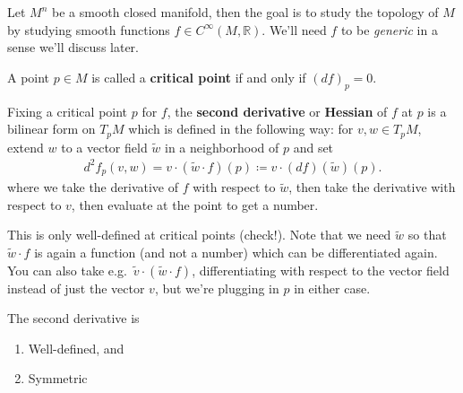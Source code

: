 Let \(M^n\) be a smooth closed manifold, then the goal is to study the
topology of \(M\) by studying smooth functions
\(f \in C^ \infty (M, {\mathbb{R}})\). We'll need \(f\) to be
\emph{generic} in a sense we'll discuss later.

\begin{definition}

A point \(p\in M\) is called a \textbf{critical point} if and only if
\((df)_p = 0\).

\end{definition}

\begin{definition}

Fixing a critical point \(p\) for \(f\), the \textbf{second derivative}
or \textbf{Hessian} of \(f\) at \(p\) is a bilinear form on \(T_pM\)
which is defined in the following way: for \(v, w\in T_p M\), extend
\(w\) to a vector field \(\tilde w\) in a neighborhood of \(p\) and set
\begin{align*}
d^2 f_p(v, w) = v\cdot (\tilde w \cdot f)(p) \coloneqq v \cdot (df)(\tilde w)(p)
.\end{align*}
where we take the derivative of \(f\) with respect to \(\tilde w\), then
take the derivative with respect to \(v\), then evaluate at the point to
get a number.

\end{definition}

\begin{remark}

This is only well-defined at critical points (check!). Note that we need
\(\tilde w\) so that \(\tilde w \cdot f\) is again a function (and not a
number) which can be differentiated again. You can also take
e.g.~\(\tilde v \cdot (\tilde w \cdot f)\), differentiating with respect
to the vector field instead of just the vector \(v\), but we're plugging
in \(p\) in either case.

\end{remark}

\begin{claim}

The second derivative is

\begin{enumerate}
\def\labelenumi{\arabic{enumi}.}
\item
  Well-defined, and
\item
  Symmetric
\end{enumerate}

\end{claim}


